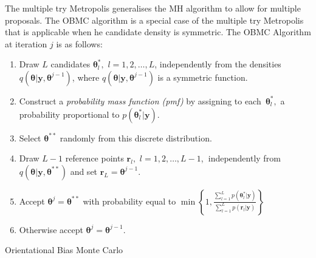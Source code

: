 \documentclass[article]{jss}
\begin{document}
The multiple try Metropolis \citep{LuiLiangWong2000} generalises the
MH algorithm to allow for multiple proposals. The OBMC algorithm is a
special case of the multiple try Metropolis that is applicable when he
candidate density is symmetric. The OBMC Algorithm at iteration $j$ is
as follows:

%
\begin{algorithm}[H]
\begin{enumerate}
\item Draw $L$ candidates $\bm{\theta}_{l}^{\ast},$ $l=1,2,\ldots,L$,
  independently from the densities
  $q\left(\bm{\theta}|\bm{y},\bm{\theta}^{j-1}\right)$, where
  $q\left(\bm{\theta}|\bm{y},\bm{\theta}^{j-1}\right)$ is a symmetric
  function.
\item Construct a \textit{probability mass function (pmf)} by
  assigning to each\emph{\ }$\bm{\theta}_{l}^{\ast},$ a probability
  proportional to $p\left(\bm{\theta}_{l}^{\ast}|\bm{y}\right).$
\item Select $\bm{\theta}^{\ast\ast}$ randomly from this discrete distribution. 
\item Draw $L-1$ reference points $\bm{r}_{l},$
  $l=1,2,\ldots,L-1$,\textbf{\ }independently from
  $q\left(\bm{\theta}|\bm{y},\bm{\theta}^{\ast\ast}\right)$ and set
  $\bm{r}_{L}=\bm{\theta}^{j-1}.$
\item Accept $\bm{\theta}^{j}=\bm{\theta}^{\ast\ast}$ with probability
  equal to $\min\left\{
    1,\frac{\sum_{l=1}^{L}p\left(\bm{\theta}_{l}^{\ast}|\bm{y}\right)}{\sum_{l=1}^{L}p\left(\bm{r}_{l}|\bm{y}\right)}\right\}
  $
\item Otherwise accept $\bm{\theta}^{j}=\bm{\theta}^{j-1}.$
\end{enumerate}
\caption{Orientational Bias Monte Carlo}
\label{alg:obmc}
\end{algorithm}
\end{document}
